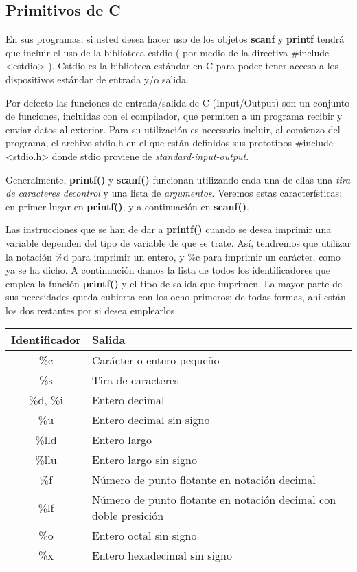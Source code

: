 \subsection{Primitivos de C}

En sus programas, si usted desea hacer uso de los objetos \textbf{scanf} y \textbf{printf} tendrá que incluir el uso de
la biblioteca cstdio ( por medio de la directiva \#include <cstdio> ). Cstdio es la biblioteca estándar en C para
poder tener acceso a los dispositivos estándar de entrada y/o salida.

Por defecto las funciones de entrada/salida de C (Input/Output) son un conjunto de funciones, incluidas
con el compilador, que permiten a un programa recibir y enviar datos al exterior. Para su
utilización es necesario incluir, al comienzo del programa, el archivo stdio.h en el que están
definidos sus prototipos \#include <stdio.h>
donde stdio proviene de \emph{standard-input-output}.

Generalmente, \textbf{printf()} y \textbf{scanf()} funcionan utilizando cada una de ellas una \emph{tira de caracteres decontrol} y una lista de \emph{argumentos}. Veremos estas características; en primer lugar en \textbf{printf()}, y a
continuación en \textbf{scanf()}.



Las instrucciones que se han de dar a \textbf{printf()} cuando se desea imprimir una variable dependen del
tipo de variable de que se trate. Así, tendremos que utilizar la notación \%d para imprimir un entero,
y \%c para imprimir un carácter, como ya se ha dicho. A continuación damos la lista de todos los
identificadores que emplea la función \textbf{printf()} y el tipo de salida que imprimen. La mayor parte de
sus necesidades queda cubierta con los ocho primeros; de todas formas, ahí están los dos restantes
por si desea emplearlos.

\begin{tabular}{|c|p{12cm}|}
	\hline
	\textbf{Identificador} & \textbf{Salida} \\
	\hline
	\%c & Carácter o entero pequeño \\
	\hline
	\%s &  Tira de caracteres \\
	\hline
	\%d, \%i &  Entero decimal \\
	\hline
	\%u &  Entero decimal sin signo\\
	\hline
	\%lld &  Entero largo\\
	\hline
	\%llu &  Entero largo sin signo\\
	\hline
	\%f &  Número de punto flotante en notación decimal\\
	\hline
	\%lf &  Número de punto flotante en notación decimal con doble presición\\
	\hline
	\%o &  Entero octal sin signo\\
	\hline
	\%x &  Entero hexadecimal sin signo\\
	\hline
\end{tabular}

